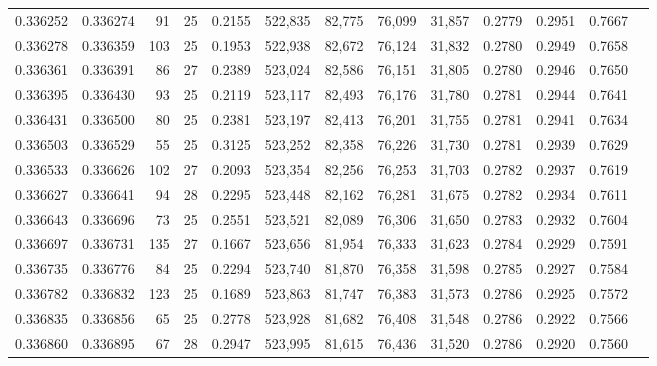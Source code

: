\begin{tabular}{rrrrrrrrrrrrr}
0.336252 & 0.336274 &    91 &  25 &                                     0.2155 & 522,835 &  82,775 &  76,099 &  31,857 & 0.2779 & 0.2951 & 0.7667 \\
0.336278 & 0.336359 &   103 &  25 &                                     0.1953 & 522,938 &  82,672 &  76,124 &  31,832 & 0.2780 & 0.2949 & 0.7658 \\
0.336361 & 0.336391 &    86 &  27 &                                     0.2389 & 523,024 &  82,586 &  76,151 &  31,805 & 0.2780 & 0.2946 & 0.7650 \\
0.336395 & 0.336430 &    93 &  25 &                                     0.2119 & 523,117 &  82,493 &  76,176 &  31,780 & 0.2781 & 0.2944 & 0.7641 \\
0.336431 & 0.336500 &    80 &  25 &                                     0.2381 & 523,197 &  82,413 &  76,201 &  31,755 & 0.2781 & 0.2941 & 0.7634 \\
0.336503 & 0.336529 &    55 &  25 &                                     0.3125 & 523,252 &  82,358 &  76,226 &  31,730 & 0.2781 & 0.2939 & 0.7629 \\
0.336533 & 0.336626 &   102 &  27 &                                     0.2093 & 523,354 &  82,256 &  76,253 &  31,703 & 0.2782 & 0.2937 & 0.7619 \\
0.336627 & 0.336641 &    94 &  28 &                                     0.2295 & 523,448 &  82,162 &  76,281 &  31,675 & 0.2782 & 0.2934 & 0.7611 \\
0.336643 & 0.336696 &    73 &  25 &                                     0.2551 & 523,521 &  82,089 &  76,306 &  31,650 & 0.2783 & 0.2932 & 0.7604 \\
0.336697 & 0.336731 &   135 &  27 &                                     0.1667 & 523,656 &  81,954 &  76,333 &  31,623 & 0.2784 & 0.2929 & 0.7591 \\
0.336735 & 0.336776 &    84 &  25 &                                     0.2294 & 523,740 &  81,870 &  76,358 &  31,598 & 0.2785 & 0.2927 & 0.7584 \\
0.336782 & 0.336832 &   123 &  25 &                                     0.1689 & 523,863 &  81,747 &  76,383 &  31,573 & 0.2786 & 0.2925 & 0.7572 \\
0.336835 & 0.336856 &    65 &  25 &                                     0.2778 & 523,928 &  81,682 &  76,408 &  31,548 & 0.2786 & 0.2922 & 0.7566 \\
0.336860 & 0.336895 &    67 &  28 &                                     0.2947 & 523,995 &  81,615 &  76,436 &  31,520 & 0.2786 & 0.2920 & 0.7560 \\

\end{tabular}

